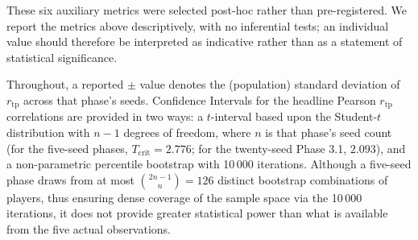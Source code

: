 \documentclass[10pt]{article} %
\newcommand{\rtp}{\ensuremath{r_{\mathrm{tp}}}}
\begin{document}
These six auxiliary metrics were selected post-hoc rather than
pre-registered. We report the metrics above descriptively, with no inferential
tests; an individual value should therefore be interpreted as
indicative rather than as a statement of statistical significance.

Throughout, a reported $\pm$ value denotes the (population) standard deviation of $\rtp$ across that phase's seeds. Confidence Intervals for the headline Pearson $\rtp$ correlations are provided in two ways: a $t$-interval based upon the Student-$t$ distribution with $n-1$ degrees of freedom, where $n$ is that phase's seed count (for the five-seed phases, $T_{\text{crit}} = 2.776$; for the twenty-seed Phase 3.1, $2.093$), and a non-parametric percentile bootstrap with 10\,000 iterations. Although a five-seed phase draws from at most $\binom{2n-1}{n} = 126$ distinct bootstrap combinations of players,
thus ensuring dense coverage of the sample space via the 10\,000
iterations, it does not provide greater statistical power than what
is available from the five actual observations.
\end{document}
